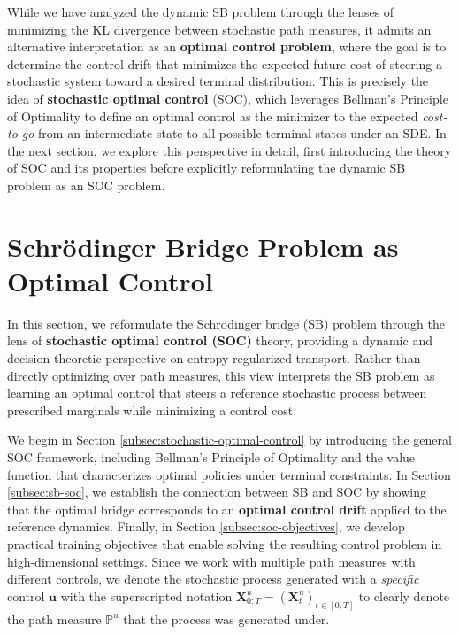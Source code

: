 \documentclass{article}
\begin{document}
While we have analyzed the dynamic SB problem through the lenses of minimizing the KL divergence between stochastic path measures, it admits an alternative interpretation as an \textbf{optimal control problem}, where the goal is to determine the control drift that minimizes the expected future cost of steering a stochastic system toward a desired terminal distribution. This is precisely the idea of \textbf{stochastic optimal control} (SOC), which leverages Bellman's Principle of Optimality to define an optimal control as the minimizer to the expected \textit{cost-to-go} from an intermediate state to all possible terminal states under an SDE. In the next section, we explore this perspective in detail, first introducing the theory of SOC and its properties before explicitly reformulating the dynamic SB problem as an SOC problem.

\newpage
\section{Schrödinger Bridge Problem as Optimal Control}
\label{sec:sb-optimal-control}
In this section, we reformulate the Schrödinger bridge (SB) problem through the lens of \textbf{stochastic optimal control (SOC)} theory, providing a dynamic and decision-theoretic perspective on entropy-regularized transport. Rather than directly optimizing over path measures, this view interprets the SB problem as learning an optimal control that steers a reference stochastic process between prescribed marginals while minimizing a control cost. 

We begin in Section \ref{subsec:stochastic-optimal-control} by introducing the general SOC framework, including Bellman’s Principle of Optimality and the value function that characterizes optimal policies under terminal constraints. In Section \ref{subsec:sb-soc}, we establish the connection between SB and SOC by showing that the optimal bridge corresponds to an \textbf{optimal control drift} applied to the reference dynamics. Finally, in Section \ref{subsec:soc-objectives}, we develop practical training objectives that enable solving the resulting control problem in high-dimensional settings. Since we work with multiple path measures with different controls, we denote the stochastic process generated with a \textit{specific} control $\boldsymbol{u}$ with the superscripted notation $\boldsymbol{X}^u_{0:T}=(\boldsymbol{X}_t^u)_{t\in [0,T]}$ to clearly denote the path measure $\mathbb{P}^u$ that the process was generated under.
\end{document}
